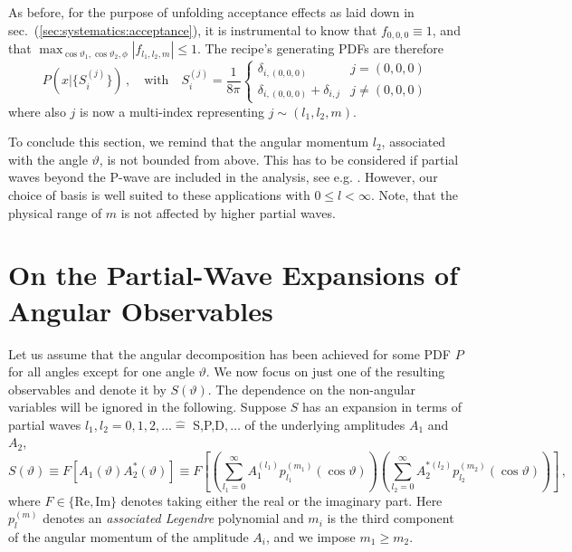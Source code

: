 \documentclass[aps,prd,reprint,nofootinbib,preprintnumbers]{revtex4}
\newcommand{\refsec}[1]{sec.~(\ref{sec:#1})}
\renewcommand{\theta}{\vartheta}
\begin{document}
As before, for the purpose of unfolding acceptance effects as laid down in \refsec{systematics:acceptance}, it is instrumental
to know that $f_{0,0,0} \equiv 1$, and that $\max_{\cos\theta_1,\cos\theta_2,\phi} |f_{l_1, l_2, m}| \leq 1$.
The recipe's generating PDFs are therefore
\begin{equation}
    \label{eq:recipe:btokstarll}
    P(x|\lbrace S_i^{(j)}\rbrace)\,,\quad\text{with}\quad S_i^{(j)} = \frac{1}{8\pi}
        \begin{cases}
            \delta_{i,(0,0,0)}                  & j = (0, 0, 0)\\
            \delta_{i,(0,0,0)}  + \delta_{i,j}  & j \neq (0, 0, 0)
        \end{cases}
\end{equation}
where also $j$ is now a multi-index representing $j \sim (l_1, l_2, m)$.

To conclude this section, we remind that the angular momentum $l_2$, associated with the angle $\theta$, is not bounded from above.
This has to be considered if partial waves beyond the P-wave are included in the analysis, see e.g. \cite{Das:2014sra}.
However, our choice of basis is well suited to these applications with $0 \leq l < \infty$. Note, that the
physical range of $m$ is not affected by higher partial waves.


\section{On the Partial-Wave Expansions of Angular Observables}
\label{app:partial-waves}

Let us assume that the angular decomposition has been achieved for
some PDF $P$ for all angles except for one angle $\theta$. We now
focus on just one of the resulting observables and denote it by
$S(\theta)$. The dependence on the non-angular variables will be
ignored in the following. Suppose $S$
has an expansion in terms of partial waves $l_1, l_2 = 0,1,2,\dots
\hat{=}$ S,P,D$,\dots$ of the underlying amplitudes $A_1$ and $A_2$,
\begin{equation}
    \label{eq:def-partial-wave-observable}
    S(\theta) \equiv F\left[A_1(\theta) A_2^*(\theta)\right] \equiv F\left[\left(\sum_{l_1=0}^\infty A_1^{(l_1)} p_{l_1}^{(m_1)}(\cos\theta)\right) \left(\sum_{l_2=0}^\infty A_2^{*(l_2)} p_{l_2}^{(m_2)}(\cos\theta)\right)\right]\,,
\end{equation}
where $F \in \{\text{Re},\text{Im}\}$ denotes taking either the real
or the imaginary part. Here $p_{l}^{(m)}$ denotes an \emph{associated Legendre} polynomial and $m_i$ is the third component of the angular momentum of the amplitude $A_i$, and we impose $m_1 \geq m_2$.\\
\end{document}
